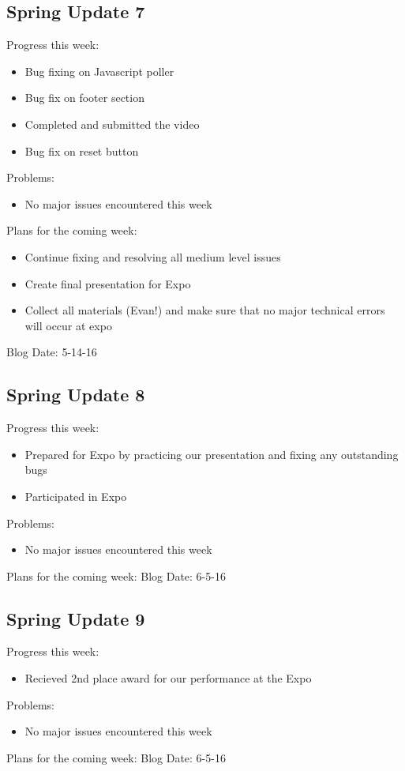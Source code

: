 \subsection{Spring Update 7}
Progress this week:
\begin{itemize}
   \item Bug fixing on Javascript poller
   \item Bug fix on footer section
   \item Completed and submitted the video
   \item Bug fix on reset button
\end{itemize}
Problems:
\begin{itemize}
   \item No major issues encountered this week
\end{itemize}
Plans for the coming week:
\begin{itemize}
   \item Continue fixing and resolving all medium level issues
   \item Create final presentation for Expo
   \item Collect all materials (Evan!) and make sure that no major technical errors will occur at expo
\end{itemize}
Blog Date: 5-14-16

\subsection{Spring Update 8}
Progress this week:
\begin{itemize}
   \item Prepared for Expo by practicing our presentation and fixing any outstanding bugs
   \item Participated in Expo
\end{itemize}
Problems:
\begin{itemize}
   \item No major issues encountered this week
\end{itemize}
Plans for the coming week:
Blog Date: 6-5-16

\subsection{Spring Update 9}
Progress this week:
\begin{itemize}
   \item Recieved 2nd place award for our performance at the Expo
\end{itemize}
Problems:
\begin{itemize}
   \item No major issues encountered this week
\end{itemize}
Plans for the coming week:
Blog Date: 6-5-16

